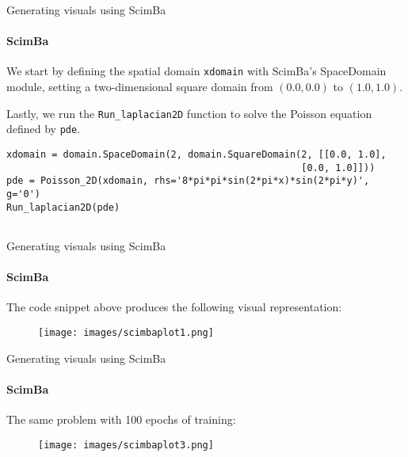 \documentclass{beamer}
\begin{document}
\begin{frame}[fragile]{Generating visuals using ScimBa}
\framesubtitle{ScimBa}


We start by defining the spatial domain \texttt{xdomain} with ScimBa's SpaceDomain module, setting a two-dimensional square domain from $(0.0, 0.0)$ to $(1.0, 1.0)$.


Lastly, we run the \texttt{Run\_laplacian2D} function to solve the Poisson equation defined by \texttt{pde}.
\begin{lstlisting}
xdomain = domain.SpaceDomain(2, domain.SquareDomain(2, [[0.0, 1.0], 
                                                    [0.0, 1.0]]))    
pde = Poisson_2D(xdomain, rhs='8*pi*pi*sin(2*pi*x)*sin(2*pi*y)', g='0')
Run_laplacian2D(pde)
    
\end{lstlisting}

\end{frame}

\begin{frame}[fragile]{Generating visuals using ScimBa}
\framesubtitle{ScimBa}
\vspace*{-0.1cm}
The code snippet above produces the following visual representation:
\vspace*{-0.2cm}
\begin{figure}
    \centering
    
    \texttt{[image: images/scimbaplot1.png]} 
    \label{scimba_plot}
\end{figure}
\end{frame}

\begin{frame}[fragile]{Generating visuals using ScimBa}
\framesubtitle{ScimBa}
\vspace*{-0.1cm}
The same problem with 100 epochs of training:
\vspace*{-0.2cm}
\begin{figure}
    \centering
    
    \texttt{[image: images/scimbaplot3.png]} 
    \label{scimba_plot}
\end{figure}
\end{frame}
\end{document}

